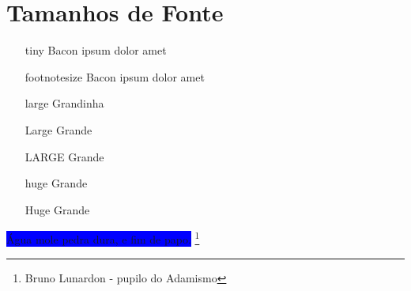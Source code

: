 \documentclass[a4paper]{article}
\begin{document}
\pagecolor{red!10}
\section{Tamanhos de Fonte}

\begin{itemize}
    \item[tiny] {\tiny  Bacon ipsum dolor amet}
    \item[footnotesize] {\footnotesize  Bacon ipsum dolor amet}
    \item[large] {\large Grandinha}
    \item[Large] {\Large Grande}
    \item[LARGE] {\LARGE Grande}
    \item[huge] {\huge Grande}
    \item[Huge] {\Huge Grande} 
\end{itemize}

\colorbox{blue}{Água mole pedra dura, e fim de papo.} \footnote{Bruno Lunardon - pupilo do Adamismo}

\vspace{2cm}

\end{document}
